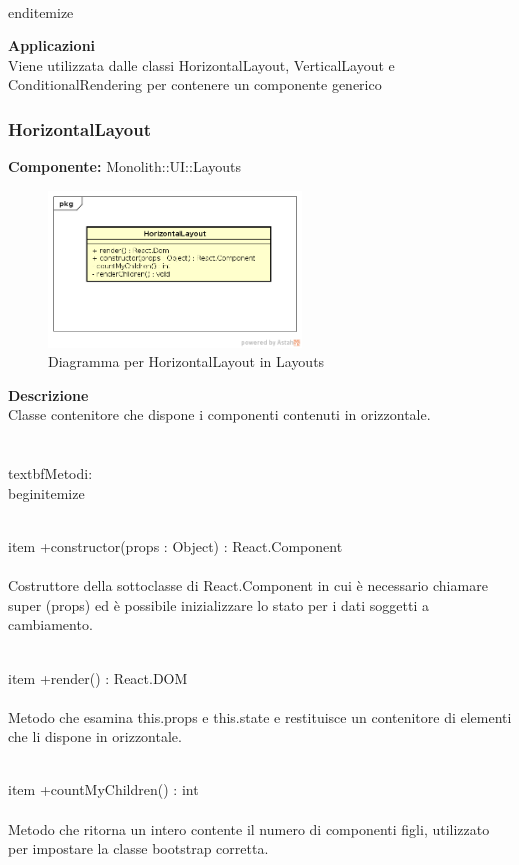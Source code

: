 \\end{itemize} 


\textbf{Applicazioni}\\
Viene utilizzata dalle classi HorizontalLayout, VerticalLayout e ConditionalRendering per contenere un componente generico 


\clearpage

\subsubsection{HorizontalLayout}
\textbf{Componente:}  Monolith::UI::Layouts\\
   \FloatBarrier
   \begin{figure}[ht]
   \centering
   \includegraphics[width=0.6\textwidth]{img/single-HorizontalLayout}
   \caption{{Diagramma per HorizontalLayout in Layouts}}
\end{figure}
\FloatBarrier
\textbf{Descrizione}\\
Classe contenitore che dispone i componenti contenuti in orizzontale. \\\\
\\textbf{Metodi:}
\\begin{itemize}

\\item +constructor(props : Object) : React.Component 
\\\\
Costruttore della sottoclasse di React.Component in cui è necessario chiamare super (props) ed è possibile inizializzare lo stato per i dati soggetti a cambiamento.

\\item +render() : React.DOM 
\\\\
Metodo che esamina this.props e this.state e restituisce un contenitore di elementi che li dispone in orizzontale.

\\item +countMyChildren() : int \\\\
Metodo che ritorna un intero contente il numero di componenti figli, utilizzato per impostare la classe bootstrap corretta.

